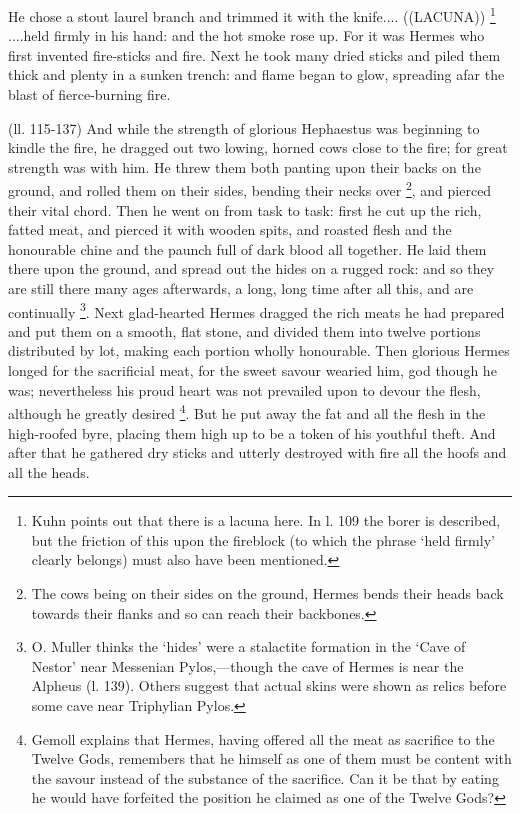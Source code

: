 He chose a stout laurel branch and trimmed it with the knife.... ((LACUNA)) \footnote{Kuhn points out that there
is a lacuna here. In l. 109 the borer is described, but the friction of this
upon the fireblock (to which the phrase ‘held firmly’ clearly
belongs) must also have been mentioned.} ....held firmly in his hand: and
the hot smoke rose up. For it was Hermes who first invented fire-sticks and
fire. Next he took many dried sticks and piled them thick and plenty in a
sunken trench: and flame began to glow, spreading afar the blast of
fierce-burning fire.

(ll. 115-137) And while the strength of glorious Hephaestus was beginning to
kindle the fire, he dragged out two lowing, horned cows close to the fire; for
great strength was with him. He threw them both panting upon their backs on the
ground, and rolled them on their sides, bending their necks over \footnote{The cows being on their
sides on the ground, Hermes bends their heads back towards their flanks and so
can reach their backbones.}, and pierced their vital chord.
Then he went on from task to task: first he cut up the rich, fatted meat, and
pierced it with wooden spits, and roasted flesh and the honourable chine and
the paunch full of dark blood all together. He laid them there upon the ground,
and spread out the hides on a rugged rock: and so they are still there many
ages afterwards, a long, long time after all this, and are continually \footnote{O. Muller thinks the
‘hides’ were a stalactite formation in the ‘Cave of
Nestor’ near Messenian Pylos,—though the cave of Hermes is near the
Alpheus (l. 139). Others suggest that actual skins were shown as relics before
some cave near Triphylian Pylos.}. Next glad-hearted Hermes dragged
the rich meats he had prepared and put them on a smooth, flat stone, and
divided them into twelve portions distributed by lot, making each portion
wholly honourable. Then glorious Hermes longed for the sacrificial meat, for
the sweet savour wearied him, god though he was; nevertheless his proud heart
was not prevailed upon to devour the flesh, although he greatly desired \footnote{Gemoll explains that
Hermes, having offered all the meat as sacrifice to the Twelve Gods, remembers
that he himself as one of them must be content with the savour instead of the
substance of the sacrifice. Can it be that by eating he would have forfeited
the position he claimed as one of the Twelve Gods?}. But he put away the fat and all
the flesh in the high-roofed byre, placing them high up to be a token of his
youthful theft. And after that he gathered dry sticks and utterly destroyed
with fire all the hoofs and all the heads.

